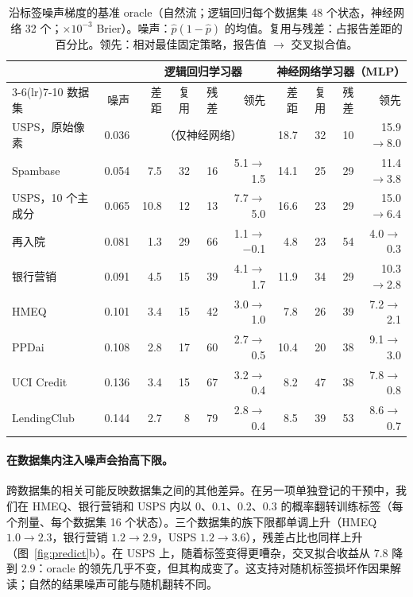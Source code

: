 \documentclass[runningheads]{llncs}
\begin{document}
\begin{table}[t]
\caption{沿标签噪声梯度的基准 oracle（自然流；逻辑回归每个数据集 48 个状态，神经网络 32 个；$\times10^{-3}$ Brier）。噪声：$\hat p(1-\hat p)$ 的均值。复用与残差：占报告差距的百分比。领先：相对最佳固定策略，报告值 $\to$ 交叉拟合值。}
\label{tab:gradient}
\centering\scriptsize
\setlength{\tabcolsep}{2.6pt}
\begin{tabular}{lrrrrrrrrr}
\toprule
& & \multicolumn{4}{c}{逻辑回归学习器} & \multicolumn{4}{c}{神经网络学习器（MLP）} \\
\cmidrule(lr){3-6}\cmidrule(lr){7-10}
数据集 & 噪声 & 差距 & 复用 & 残差 & 领先 & 差距 & 复用 & 残差 & 领先 \\
\midrule
USPS，原始像素 & 0.036 & \multicolumn{4}{c}{（仅神经网络）} & 18.7 & 32 & 10 & 15.9$\to$8.0 \\
Spambase & 0.054 & 7.5 & 32 & 16 & 5.1$\to$1.5 & 14.1 & 25 & 29 & 11.4$\to$3.8 \\
USPS，10 个主成分 & 0.065 & 10.8 & 12 & 13 & 7.7$\to$5.0 & 16.6 & 23 & 29 & 15.0$\to$6.4 \\
再入院 & 0.081 & 1.3 & 29 & 66 & 1.1$\to$$-$0.1 & 4.8 & 23 & 54 & 4.0$\to$0.3 \\
银行营销 & 0.091 & 4.5 & 15 & 39 & 4.1$\to$1.7 & 11.9 & 34 & 29 & 10.3$\to$2.8 \\
HMEQ & 0.101 & 3.4 & 15 & 42 & 3.0$\to$1.0 & 7.8 & 26 & 39 & 7.2$\to$2.1 \\
PPDai & 0.108 & 2.8 & 17 & 60 & 2.7$\to$0.5 & 10.4 & 20 & 38 & 9.1$\to$3.0 \\
UCI Credit & 0.136 & 3.4 & 15 & 67 & 3.2$\to$0.4 & 8.2 & 47 & 38 & 7.8$\to$0.8 \\
LendingClub & 0.144 & 2.7 & 8 & 79 & 2.8$\to$0.4 & 8.5 & 39 & 53 & 8.6$\to$0.7 \\
\bottomrule
\end{tabular}
\end{table}

\paragraph{在数据集内注入噪声会抬高下限。}跨数据集的相关可能反映数据集之间的其他差异。在另一项单独登记的干预中，我们在 HMEQ、银行营销和 USPS 内以 $0$、$0.1$、$0.2$、$0.3$ 的概率翻转训练标签（每个剂量、每个数据集 16 个状态）。三个数据集的族下限都单调上升（HMEQ $1.0\to2.3$，银行营销 $1.2\to2.9$，USPS $1.2\to3.6$），残差占比也同样上升（图~\ref{fig:predict}b）。在 USPS 上，随着标签变得更嘈杂，交叉拟合收益从 $7.8$ 降到 $2.9$：oracle 的领先几乎不变，但其构成变了。这支持对随机标签损坏作因果解读；自然的结果噪声可能与随机翻转不同。
\end{document}
